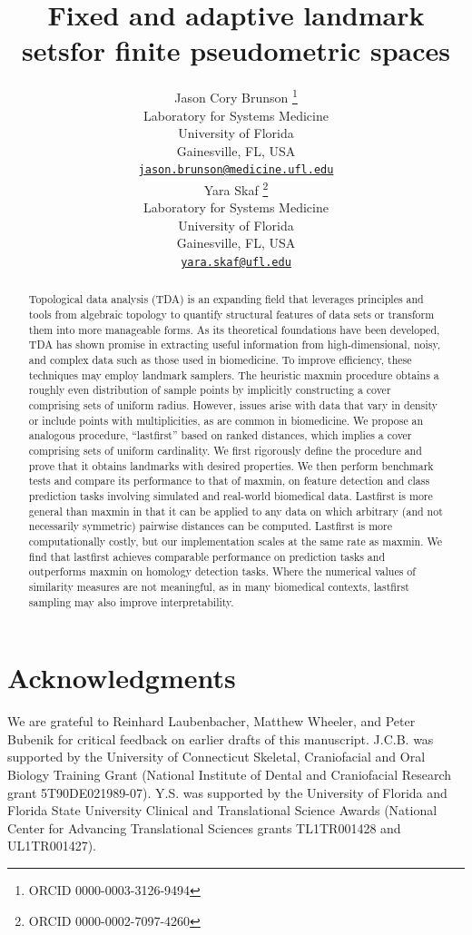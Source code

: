 \documentclass{article}
\title{Fixed and adaptive landmark sets\linebreak for finite
pseudometric spaces}
\author{
    Jason Cory Brunson
    \thanks{ORCID 0000-0003-3126-9494}
   \\
    Laboratory for Systems Medicine \\
    University of Florida \\
  Gainesville, FL, USA \\
  \texttt{\href{mailto:jason.brunson@medicine.ufl.edu}{\nolinkurl{jason.brunson@medicine.ufl.edu}}} \\
   \And
    Yara Skaf
    \thanks{ORCID 0000-0002-7097-4260}
   \\
    Laboratory for Systems Medicine \\
    University of Florida \\
  Gainesville, FL, USA \\
  \texttt{\href{mailto:yara.skaf@ufl.edu}{\nolinkurl{yara.skaf@ufl.edu}}} \\
  }
\begin{document}
\maketitle


\begin{abstract}
Topological data analysis (TDA) is an expanding field that leverages
principles and tools from algebraic topology to quantify structural
features of data sets or transform them into more manageable forms. As
its theoretical foundations have been developed, TDA has shown promise
in extracting useful information from high-dimensional, noisy, and
complex data such as those used in biomedicine. To improve efficiency,
these techniques may employ landmark samplers. The heuristic maxmin
procedure obtains a roughly even distribution of sample points by
implicitly constructing a cover comprising sets of uniform radius.
However, issues arise with data that vary in density or include points
with multiplicities, as are common in biomedicine. We propose an
analogous procedure, ``lastfirst'' based on ranked distances, which
implies a cover comprising sets of uniform cardinality. We first
rigorously define the procedure and prove that it obtains landmarks with
desired properties. We then perform benchmark tests and compare its
performance to that of maxmin, on feature detection and class prediction
tasks involving simulated and real-world biomedical data. Lastfirst is
more general than maxmin in that it can be applied to any data on which
arbitrary (and not necessarily symmetric) pairwise distances can be
computed. Lastfirst is more computationally costly, but our
implementation scales at the same rate as maxmin. We find that lastfirst
achieves comparable performance on prediction tasks and outperforms
maxmin on homology detection tasks. Where the numerical values of
similarity measures are not meaningful, as in many biomedical contexts,
lastfirst sampling may also improve interpretability.
\end{abstract}


\hypertarget{acknowledgments}{%
\section*{Acknowledgments}\label{acknowledgments}}

We are grateful to Reinhard Laubenbacher, Matthew Wheeler, and Peter
Bubenik for critical feedback on earlier drafts of this manuscript.
J.C.B. was supported by the University of Connecticut Skeletal,
Craniofacial and Oral Biology Training Grant (National Institute of
Dental and Craniofacial Research grant 5T90DE021989-07). Y.S. was
supported by the University of Florida and Florida State University
Clinical and Translational Science Awards (National Center for Advancing
Translational Sciences grants TL1TR001428 and UL1TR001427).
\end{document}
